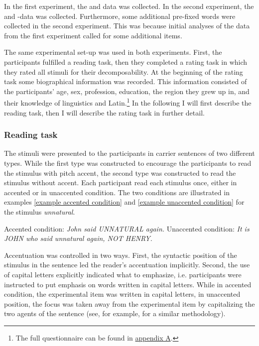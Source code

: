 In the first experiment, the  and data was collected.
In the second experiment, the  and -data was collected. Furthermore, some additional pre-fixed words were collected in the second experiment. 
This was because initial analyses of the data from the first experiment called for some additional items.
 
 The same experimental set-up was used in both experiments. First, the participants fulfilled a reading task, then they completed a rating task in which they rated all stimuli for their decomposability. 
 At the beginning of the rating task some biographical information was recorded. This information consisted of the participants' age, sex, profession, education, the region they grew up in, and their knowledge of linguistics and Latin.\footnote{The full questionnaire can be found in \hyperref[Appendix A: Decomposability Rating]{appendix A}.}  In the following I will first describe the reading task, then I will describe the rating task in further detail. 

\subsubsection{Reading task}


The stimuli were presented to the participants in carrier sentences of two different types. 
While the first type was constructed to encourage the participants to read the stimulus with pitch accent, the second type was constructed to read the stimulus without accent. Each participant read each stimulus once, either in accented or in unaccented condition. 
The two conditions are illustrated in examples \ref{example accented condition}  and \ref{example unaccented condition} for the stimulus \textit{unnatural}.  


\begin{exe} 
	\ex \label{example accented condition} Accented condition:  \hspace*{.5cm}\textit{John said UNNATURAL again.}
	\ex \label{example unaccented condition} Unaccented condition: \hspace*{0cm} \textit{It is JOHN who said unnatural again, NOT HENRY.}
\end{exe}

Accentuation was controlled in two ways. First, the syntactic position of the stimulus in the sentence led the reader's accentuation implicitly. Second, the use of capital letters explicitly indicated what to emphasize,  i.e. participants were instructed to put emphasis on words written in capital letters. While in accented condition, the experimental item was written in capital letters, in unaccented position, the focus was taken away from the experimental item by capitalizing  the two agents of the sentence (see, for example, \cite{Plag.2011} for a similar methodology).


